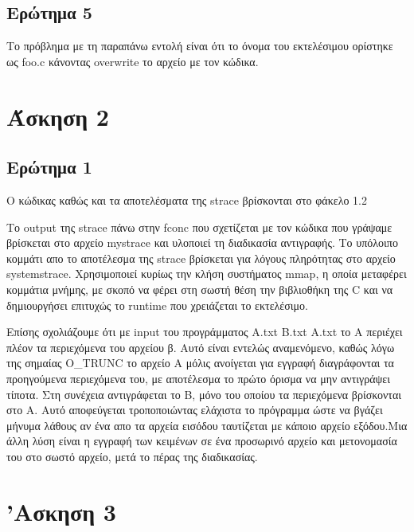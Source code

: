 \documentclass[12pt]{article}
\begin{document}
 
 \subsection*{Ερώτημα 5}
 Το πρόβλημα με τη παραπάνω εντολή είναι ότι το όνομα του εκτελέσιμου ορίστηκε ως \textlatin{foo.c} κάνοντας \textlatin{overwrite} το αρχείο με τον κώδικα.
 
 
 \section*{Άσκηση 2}
 
 \subsection*{Ερώτημα 1} 
 
 Ο κώδικας καθώς και τα αποτελέσματα της \textlatin{strace} βρίσκονται στο φάκελο \textlatin{1.2}
 
 Το \textlatin{output} της \textlatin{strace} πάνω στην \textlatin{fconc} που σχετίζεται με τον κώδικα που γράψαμε βρίσκεται στο αρχείο \textlatin{mystrace} και υλοποιεί τη διαδικασία αντιγραφής. Το υπόλοιπο κομμάτι απο το αποτέλεσμα της \textlatin{strace} βρίσκεται για λόγους πληρότητας στο αρχείο \textlatin{systemstrace}. Χρησιμοποιεί κυρίως την κλήση συστήματος \textlatin{mmap}, η οποία μεταφέρει κομμάτια μνήμης, με σκοπό να φέρει στη σωστή θέση την βιβλιοθήκη της \textlatin{C} και να δημιουργήσει επιτυχώς το \textlatin{runtime} που χρειάζεται το εκτελέσιμο.
 
 Επίσης σχολιάζουμε ότι με \textlatin{input} του προγράμματος \textlatin{A.txt B.txt A.txt} το A περιέχει πλέον τα περιεχόμενα του αρχείου β. Αυτό είναι εντελώς αναμενόμενο, καθώς λόγω της σημαίας  \textlatin{O\_TRUNC} το αρχείο Α μόλις ανοίγεται για εγγραφή διαγράφονται τα προηγούμενα περιεχόμενα του, με αποτέλεσμα το πρώτο όρισμα να μην αντιγράψει τίποτα. Στη συνέχεια αντιγράφεται το Β, μόνο του οποίου τα περιεχόμενα βρίσκονται στο Α.
 Αυτό αποφεύγεται τροποποιώντας ελάχιστα το πρόγραμμα ώστε να βγάζει μήνυμα λάθους αν ένα απο τα αρχεία εισόδου ταυτίζεται με κάποιο αρχείο εξόδου.Μια άλλη λύση είναι η εγγραφή των κειμένων σε ένα προσωρινό αρχείο και μετονομασία του στο σωστό αρχείο, μετά το πέρας της διαδικασίας. 
 
 
 
 \section*{'Ασκηση 3}
 
\end{document}
